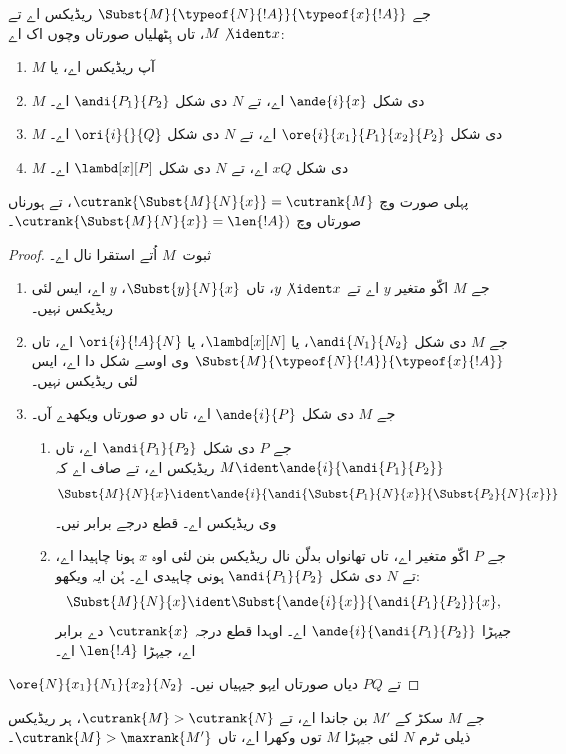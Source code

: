 \documentclass[../../../include/open-logic-section]{subfiles}
\begin{document}
\begin{lem}
  جے $\Subst{M}{\typeof{N}{!A}}{\typeof{x}{!A}}$ ریڈیکس اے تے $M
  \not\ident x$، تاں ہِٹھلیاں صورتاں وچوں اک اے:
  \begin{enumerate}
  \item $M$ آپ ریڈیکس اے، یا
  \item $M$ دی شکل $\ande{i}{x}$ اے، تے $N$ دی شکل $\andi{P_1}{P_2}$ اے۔
  \item $M$ دی شکل $\ore{i}{x_1}{P_1}{x_2}{P_2}$ اے، تے $N$ دی شکل $\ori{i}{}{Q}$ اے۔
  \item $M$ دی شکل $x Q$ اے، تے $N$ دی شکل $\lambd[x][P]$ اے۔
  \end{enumerate}
  پہلی صورت وچ $\cutrank{\Subst{M}{N}{x}} = \cutrank{M}$، تے ہورناں صورتاں وچ $\cutrank{\Subst{M}{N}{x}} = \len{!A})$۔
\end{lem}
\begin{proof}
  ثبوت~$M$ اُتے استقرا نال اے۔
  \begin{enumerate}
  \item جے $M$ اکّو متغیر $y$ اے تے $y \not\ident x$، تاں $\Subst{y}{N}{x}$، $y$ اے، ایس لئی ریڈیکس نہیں۔
  \item جے $M$ دی شکل $\andi{N_1}{N_2}$، یا $\lambd[x][N]$، یا $\ori{i}{!A}{N}$ اے، تاں $\Subst{M}{\typeof{N}{!A}}{\typeof{x}{!A}}$ وی اوسے شکل دا اے، ایس لئی ریڈیکس نہیں۔
  \item جے $M$ دی شکل $\ande{i}{P}$ اے، تاں دو صورتاں ویکھدے آں۔
    \begin{enumerate}
      \item جے $P$ دی شکل $\andi{P_1}{P_2}$ اے، تاں $M \ident
        \ande{i}{\andi{P_1}{P_2}}$ ریڈیکس اے، تے صاف اے کہ
        \[
        \Subst{M}{N}{x} \ident
        \ande{i}{\andi{\Subst{P_1}{N}{x}}{\Subst{P_2}{N}{x}}}
        \]
        وی ریڈیکس اے۔ قطع درجے برابر نیں۔
      \item جے $P$ اکّو متغیر اے، تاں تھانواں بدلّن نال ریڈیکس بنن لئی اوہ $x$ ہونا چاہیدا اے، تے $N$ دی شکل $\andi{P_1}{P_2}$ ہونی چاہیدی اے۔ ہُن ایہ ویکھو:
        \[
        \Subst{M}{N}{x} \ident \Subst{\ande{i}{x}}{\andi{P_1}{P_2}}{x},
        \]
        جیہڑا $\ande{i}{\andi{P_1}{P_2}}$ اے۔ اوہدا قطع درجہ $\cutrank{x}$ دے برابر اے، جیہڑا $\len{!A}$ اے۔
    \end{enumerate}
  \end{enumerate}
  $\ore{N}{x_1}{N_1}{x_2}{N_2}$ تے $P Q$ دیاں صورتاں ایہو جیہیاں نیں۔
\end{proof}

\begin{lem}
  جے $M$ سکڑ کے $M'$ بن جاندا اے، تے $\cutrank{M} > \cutrank{N}$، ہر ریڈیکس ذیلی ٹرم $N$ لئی جیہڑا $M$ توں وکھرا اے، تاں $\cutrank{M} >
  \maxrank{M'}$۔
\end{lem}
\end{document}
